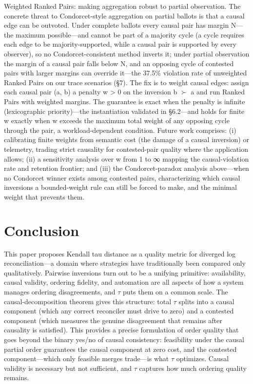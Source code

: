 \documentclass[10pt,twocolumn]{article}
\begin{document}
Weighted Ranked Pairs: making aggregation robust to partial observation. The concrete threat to Condorcet-style aggregation on partial ballots is that a causal edge can be outvoted. Under complete ballots every causal pair has margin N—the maximum possible—and cannot be part of a majority cycle (a cycle requires each edge to be majority-supported, while a causal pair is supported by every observer), so no Condorcet-consistent method inverts it; under partial observation the margin of a causal pair falls below N, and an opposing cycle of contested pairs with larger margins can override it—the 37.5\% violation rate of unweighted Ranked Pairs on our trace scenarios (§7). The fix is to weight causal edges: assign each causal pair (a, b) a penalty w > 0 on the inversion b $\succ$ a and run Ranked Pairs with weighted margins. The guarantee is exact when the penalty is infinite (lexicographic priority)—the instantiation validated in §6.2—and holds for finite w exactly when w exceeds the maximum total weight of any opposing cycle through the pair, a workload-dependent condition. Future work comprises: (i) calibrating finite weights from semantic cost (the damage of a causal inversion) or telemetry, trading strict causality for contested-pair quality where the application allows; (ii) a sensitivity analysis over w from 1 to ∞ mapping the causal-violation rate and retention frontier; and (iii) the Condorcet-paradox analysis above—when no Condorcet winner exists among contested pairs, characterizing which causal inversions a bounded-weight rule can still be forced to make, and the minimal weight that prevents them.

\section{Conclusion}
This paper proposes Kendall tau distance as a quality metric for diverged log reconciliation—a domain where strategies have traditionally been compared only qualitatively. Pairwise inversions turn out to be a unifying primitive: availability, causal validity, ordering fidelity, and automation are all aspects of how a system manages ordering disagreements, and $\tau$ puts them on a common scale. The causal-decomposition theorem gives this structure: total $\tau$ splits into a causal component (which any correct reconciler must drive to zero) and a contested component (which measures the genuine disagreement that remains after causality is satisfied). This provides a precise formulation of order quality that goes beyond the binary yes/no of causal consistency: feasibility under the causal partial order guarantees the causal component at zero cost, and the contested component—which only feasible merges trade—is what $\tau$ optimizes. Causal validity is necessary but not sufficient, and $\tau$ captures how much ordering quality remains.
\end{document}
